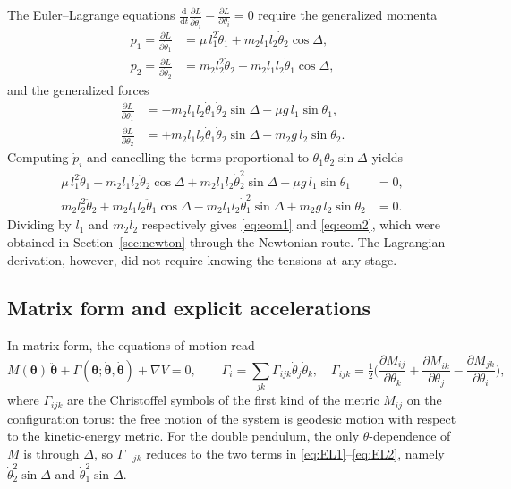 \documentclass[11pt,a4paper]{book}
\theoremstyle{definition}
\theoremstyle{remark}
\newcommand{\dd}{\mathrm{d}}
\begin{document}
The Euler--Lagrange equations $\frac{\dd}{\dd t}\frac{\partial L}{\partial\dot\theta_i}-\frac{\partial L}{\partial\theta_i}=0$
require the generalized momenta
\begin{align}
  p_1=\frac{\partial L}{\partial\dot\theta_1}&=\mu\,l_1^2\dot\theta_1+m_2l_1l_2\dot\theta_2\cos\Delta,\\
  p_2=\frac{\partial L}{\partial\dot\theta_2}&=m_2l_2^2\dot\theta_2+m_2l_1l_2\dot\theta_1\cos\Delta,
\end{align}
and the generalized forces
\begin{align}
  \frac{\partial L}{\partial\theta_1}&=-m_2l_1l_2\dot\theta_1\dot\theta_2\sin\Delta-\mu g\,l_1\sin\theta_1,\\
  \frac{\partial L}{\partial\theta_2}&=+m_2l_1l_2\dot\theta_1\dot\theta_2\sin\Delta-m_2g\,l_2\sin\theta_2 .
\end{align}
Computing $\dot p_i$ and cancelling the terms proportional to $\dot\theta_1\dot\theta_2\sin\Delta$ yields
\begin{align}
  \mu\,l_1^2\ddot\theta_1+m_2l_1l_2\ddot\theta_2\cos\Delta+m_2l_1l_2\dot\theta_2^2\sin\Delta+\mu g\,l_1\sin\theta_1&=0,
  \label{eq:EL1}\\
  m_2l_2^2\ddot\theta_2+m_2l_1l_2\ddot\theta_1\cos\Delta-m_2l_1l_2\dot\theta_1^2\sin\Delta+m_2g\,l_2\sin\theta_2&=0.
  \label{eq:EL2}
\end{align}
Dividing by $l_1$ and $m_2l_2$ respectively gives \eqref{eq:eom1} and \eqref{eq:eom2}, which were obtained
in Section~\ref{sec:newton} through the Newtonian route. The Lagrangian derivation, however, did not require
knowing the tensions at any stage.

\subsection{Matrix form and explicit accelerations}

In matrix form, the equations of motion read
\begin{equation}
  M(\bm\theta)\,\ddot{\bm\theta}+\Gamma(\bm\theta;\dot{\bm\theta},\dot{\bm\theta})+\nabla V=0,
  \qquad
  \Gamma_i=\sum_{jk}\Gamma_{ijk}\dot\theta_j\dot\theta_k,\quad
  \Gamma_{ijk}=\tfrac12\Big(\frac{\partial M_{ij}}{\partial\theta_k}+\frac{\partial M_{ik}}{\partial\theta_j}-\frac{\partial M_{jk}}{\partial\theta_i}\Big),
  \label{eq:matrixform}
\end{equation}
where $\Gamma_{ijk}$ are the Christoffel symbols of the first kind of the metric $M_{ij}$ on the configuration
torus: the free motion of the system is geodesic motion with respect to the kinetic-energy metric. For the double
pendulum, the only $\theta$-dependence of $M$ is through $\Delta$, so $\Gamma_{\,\cdot\,jk}$ reduces to the two
terms in \eqref{eq:EL1}--\eqref{eq:EL2}, namely $\dot\theta_2^2\sin\Delta$ and $\dot\theta_1^2\sin\Delta$.
\end{document}
